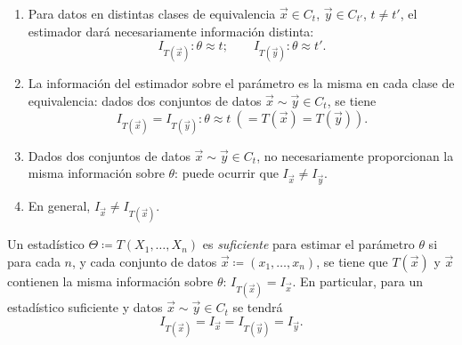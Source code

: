 \begin{observacion}[1]
\begin{enumerate}
  \item Para datos en distintas clases de equivalencia $\vec{x} \in C_t$, $\vec{y} \in C_{t'}$, $t \neq t'$, el estimador dará necesariamente información distinta:
  \[
    I_{T(\vec{x})} : \theta \approx t; \qquad I_{T(\vec{y})} : \theta \approx t'.
  \]
  \item La información del estimador sobre el parámetro es la misma en cada clase de equivalencia: dados dos conjuntos de datos $\vec{x} \sim \vec{y} \in C_t$, se tiene
  \[
    I_{T(\vec{x})} = I_{T(\vec{y})} : \theta \approx t \ (= T(\vec{x}) = T(\vec{y})).
  \]
  \item Dados dos conjuntos de datos $\vec{x} \sim \vec{y} \in C_t$, no necesariamente proporcionan la misma información sobre $\theta$: puede ocurrir que $I_{\vec{x}} \neq I_{\vec{y}}$.
  \item En general, $I_{\vec{x}} \neq I_{T(\vec{x})}$.
\end{enumerate}
\end{observacion}

\begin{definicion}[4]
Un estadístico $\Theta \coloneqq T(X_1, \dots, X_n)$ es \emph{suficiente} para estimar el parámetro $\theta$ si para cada $n$, y cada conjunto de datos $\vec{x} \coloneqq (x_1, \dots, x_n)$, se tiene que $T(\vec{x})$ y $\vec{x}$ contienen la misma información sobre $\theta$: $I_{T(\vec{x})} = I_{\vec{x}}$. En particular, para un estadístico suficiente y datos $\vec{x} \sim \vec{y} \in C_t$ se tendrá
\[
  I_{T(\vec{x})} = I_{\vec{x}} = I_{T(\vec{y})} = I_{\vec{y}}.
\]
\end{definicion}

